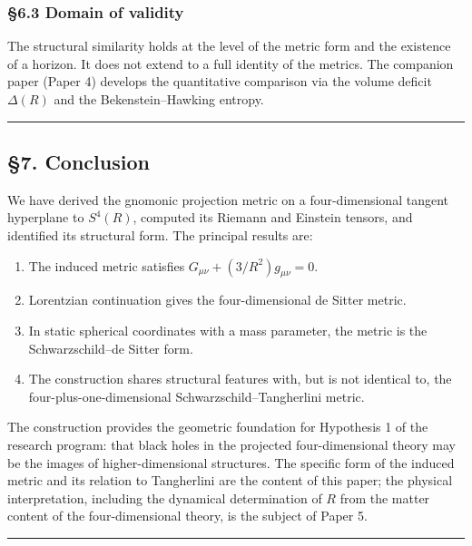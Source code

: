 \documentclass[a4paper,11pt]{article}
\theoremstyle{definition}
\providecommand{\tightlist}{\setlength{\itemsep}{0pt}\setlength{\parskip}{0pt}}
\begin{document}
\subsubsection{§6.3 Domain of validity}\label{domain-of-validity}

The structural similarity holds at the level of the metric form and the
existence of a horizon. It does not extend to a full identity of the
metrics. The companion paper (Paper 4) develops the quantitative
comparison via the volume deficit \(\Delta(R)\) and the
Bekenstein--Hawking entropy.

\begin{center}\rule{0.5\linewidth}{0.5pt}\end{center}

\subsection{§7. Conclusion}\label{conclusion}

We have derived the gnomonic projection metric on a four-dimensional
tangent hyperplane to \(S^4(R)\), computed its Riemann and Einstein
tensors, and identified its structural form. The principal results are:

\begin{enumerate}
\def\labelenumi{\arabic{enumi}.}
\tightlist
\item
  The induced metric satisfies \(G_{\mu\nu} + (3/R^2) g_{\mu\nu} = 0\).
\item
  Lorentzian continuation gives the four-dimensional de Sitter metric.
\item
  In static spherical coordinates with a mass parameter, the metric is
  the Schwarzschild--de Sitter form.
\item
  The construction shares structural features with, but is not identical
  to, the four-plus-one-dimensional Schwarzschild--Tangherlini metric.
\end{enumerate}

The construction provides the geometric foundation for Hypothesis 1 of
the research program: that black holes in the projected four-dimensional
theory may be the images of higher-dimensional structures. The specific
form of the induced metric and its relation to Tangherlini are the
content of this paper; the physical interpretation, including the
dynamical determination of \(R\) from the matter content of the
four-dimensional theory, is the subject of Paper 5.

\begin{center}\rule{0.5\linewidth}{0.5pt}\end{center}
\end{document}
